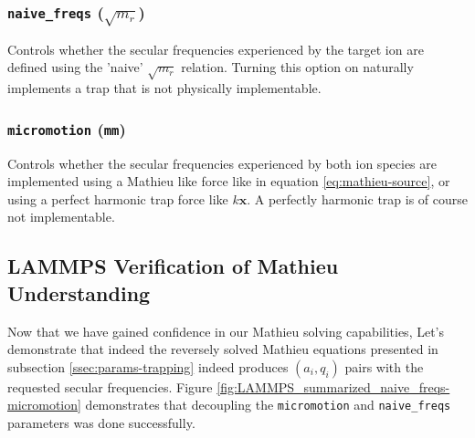 \subsubsection*{\texttt{naive\_freqs} ($\sqrt{m_r}$)}

Controls whether the secular frequencies experienced by the target  ion are defined using the 'naive' $\sqrt{m_r}$ relation. Turning this option on naturally implements a trap that is not physically implementable.

\subsubsection*{\texttt{micromotion} (\texttt{mm})}

Controls whether the secular frequencies experienced by both ion species are implemented using a Mathieu like force like in equation \ref{eq:mathieu-source}, or using a perfect harmonic trap force like $k \mathbf{x}$. A perfectly harmonic trap is of course not implementable.

\subsection{LAMMPS Verification of Mathieu Understanding}

Now that we have gained confidence in our Mathieu solving capabilities, Let's demonstrate that indeed the reversely solved Mathieu equations presented in subsection \ref{ssec:params-trapping} indeed produces $(a_i, q_i)$ pairs with the requested secular frequencies. Figure \ref{fig:LAMMPS_summarized_naive_freqs-micromotion} demonstrates that decoupling the \texttt{micromotion} and \texttt{naive\_freqs} parameters was done successfully.

